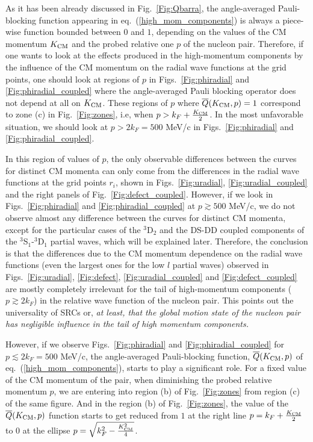 \documentclass[aps,twocolumn,showpacs,preprintnumbers,amsmath,amssymb,nofootinbib,superscriptaddress,showkeys,noeprint]{revtex4-1}
\begin{document}
As it has been already discussed in Fig.~\ref{Fig:Qbarra}, the
angle-averaged Pauli-blocking function appearing in
eq.~(\ref{high_mom_components}) is always a piece-wise function
bounded between $0$ and $1$, depending on the values of the CM
momentum $K_{\rm CM}$ and the probed relative one $p$ of the nucleon
pair. Therefore, if one wants to look at the effects produced in the
high-momentum components by the influence of the CM momentum on the
radial wave functions at the grid points, one should look at regions
of $p$ in Figs.~\ref{Fig:phiradial} and \ref{Fig:phiradial_coupled}
where the angle-averaged Pauli blocking operator does not depend at
all on $K_{\rm CM}$.  These regions of $p$ where $\overline{Q}(K_{\rm
  CM},p)=1$ correspond to zone (c) in Fig.~\ref{Fig:zones}, i.e, when
$p > k_F + \frac{K_{\rm CM}}{2}$. In the most unfavorable situation,
we should look at $p > 2 k_F = 500$ MeV/c in Figs.~\ref{Fig:phiradial}
and \ref{Fig:phiradial_coupled}.

In this region of values of $p$, the only observable differences
between the curves for distinct CM momenta can only come from the
differences in the radial wave functions at the grid points $r_i$,
shown in Figs.~\ref{Fig:uradial}, \ref{Fig:uradial_coupled} and the
right panels of Fig.~\ref{Fig:defect_coupled}.  However, if we look in
Figs.~\ref{Fig:phiradial} and \ref{Fig:phiradial_coupled} at $p
\gtrsim 500$ MeV/c, we do not observe almost any difference between
the curves for distinct CM momenta, except for the particular cases of
the ${}^{3}$D$_2$ and the DS-DD coupled components of the
${}^3$S$_1$-${}^3$D$_1$ partial waves, which will be explained later.
Therefore, the conclusion is that the differences due to the CM
momentum dependence on the radial wave functions (even the largest
ones for the low $l$ partial waves) observed in
Figs.~\ref{Fig:uradial}, \ref{Fig:defect}, \ref{Fig:uradial_coupled}
and \ref{Fig:defect_coupled} are mostly completely irrelevant for the
tail of high-momentum components ($p \gtrsim 2 k_F$) in the relative
wave function of the nucleon pair. This points out the universality of
SRCs or, \emph{at least, that the global motion state of the nucleon
pair has negligible influence in the tail of high momentum
components.}

However, if we observe Figs.~\ref{Fig:phiradial} and
\ref{Fig:phiradial_coupled} for $p\lesssim 2k_F = 500$ MeV/c, the
angle-averaged Pauli-blocking function, $\overline{Q}(K_{\rm CM},p)$
of eq.~(\ref{high_mom_components}), starts to play a significant
role. For a fixed value of the CM momentum of the pair, when
diminishing the probed relative momentum $p$, we are entering into
region (b) of Fig.~\ref{Fig:zones} from region (c) of the same figure.
And in the region (b) of Fig.~\ref{Fig:zones}, the value of the
$\overline{Q}(K_{\rm CM},p)$ function starts to get reduced from $1$
at the right line $p=k_F + \frac{K_{\rm CM}}{2}$ to $0$ at the ellipse
$p=\sqrt{k^2_F - \frac{K^2_{\rm CM}}{4}}$.
\end{document}
